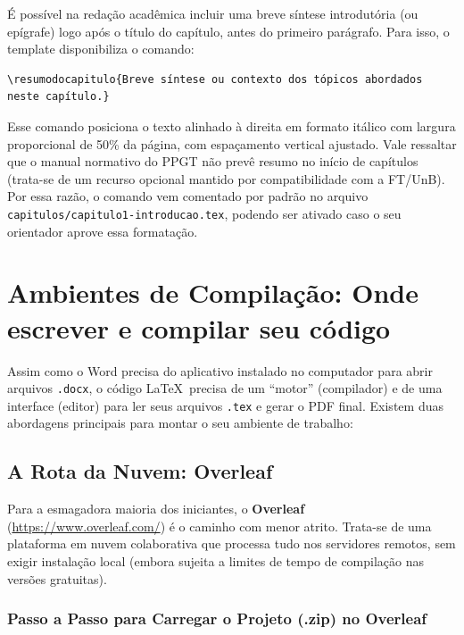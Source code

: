 \documentclass[12pt, a4paper]{article}
\begin{document}
É possível na redação acadêmica incluir uma breve síntese introdutória (ou epígrafe) logo após o título do capítulo, antes do primeiro parágrafo. Para isso, o template disponibiliza o comando:

{\small
\begin{verbatim}
\resumodocapitulo{Breve síntese ou contexto dos tópicos abordados neste capítulo.}
\end{verbatim}
}

Esse comando posiciona o texto alinhado à direita em formato itálico com largura proporcional de 50\% da página, com espaçamento vertical ajustado. Vale ressaltar que o manual normativo do PPGT não prevê resumo no início de capítulos (trata-se de um recurso opcional mantido por compatibilidade com a FT/UnB). Por essa razão, o comando vem comentado por padrão no arquivo \texttt{capitulos/capitulo1-introducao.tex}, podendo ser ativado caso o seu orientador aprove essa formatação.

\section{Ambientes de Compilação: Onde escrever e compilar seu código}

Assim como o Word precisa do aplicativo instalado no computador para abrir arquivos \texttt{.docx}, o código \LaTeX \ precisa de um ``motor'' (compilador) e de uma interface (editor) para ler seus arquivos \texttt{.tex} e gerar o PDF final. Existem duas abordagens principais para montar o seu ambiente de trabalho:

\subsection{A Rota da Nuvem: Overleaf}

Para a esmagadora maioria dos iniciantes, o \textbf{Overleaf} (\url{https://www.overleaf.com/}) é o caminho com menor atrito. Trata-se de uma plataforma em nuvem colaborativa que processa tudo nos servidores remotos, sem exigir instalação local (embora sujeita a limites de tempo de compilação nas versões gratuitas).

\subsubsection{Passo a Passo para Carregar o Projeto (.zip) no Overleaf}
\end{document}
